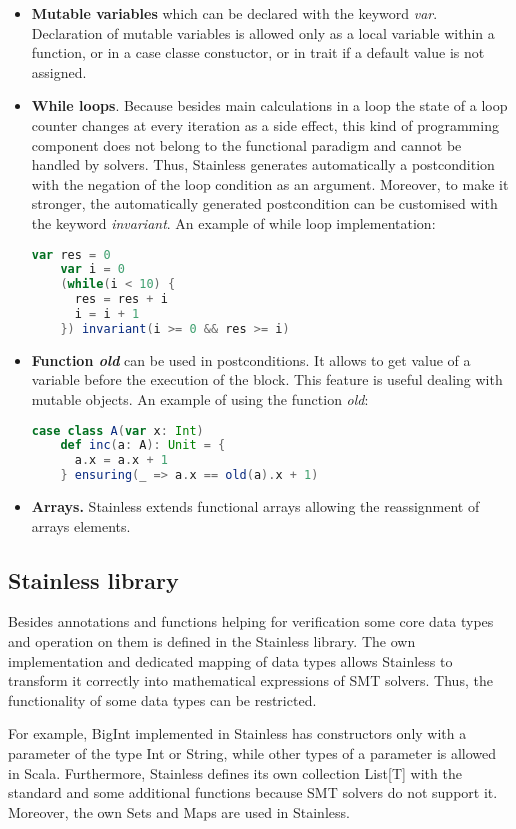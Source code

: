 \begin{itemize}
  \item \textbf{Mutable variables} which can be declared with the keyword \textit{var}.
  Declaration of mutable variables is allowed only as a local variable within a function, or in a case classe constuctor, or in trait if a default value is not assigned.
  \item  \textbf{While loops}. 
  Because besides main calculations in a loop the state of a loop counter changes at every iteration as a side effect, this kind of programming component does not belong to the functional paradigm and cannot be handled by solvers.
  Thus, Stainless generates automatically a postcondition with the negation of the loop condition as an argument. 
  Moreover, to make it stronger, the automatically generated postcondition can be customised with the keyword \textit{invariant}.
  An example of while loop implementation:
  \begin{lstlisting}[language=Scala]
    var res = 0
    var i = 0
    (while(i < 10) {
      res = res + i
      i = i + 1
    }) invariant(i >= 0 && res >= i)
  \end{lstlisting}
  \item \textbf{Function \textit{old}} can be used in postconditions. 
  It allows to get value of a variable before the execution of the block.
  This feature is useful dealing with mutable objects.
  An example of using the function \textit{old}:
  \begin{lstlisting}[language=Scala]
    case class A(var x: Int)
    def inc(a: A): Unit = {
      a.x = a.x + 1
    } ensuring(_ => a.x == old(a).x + 1)
  \end{lstlisting}
  \item \textbf{Arrays.} Stainless extends functional arrays allowing the reassignment of arrays elements. \cite{Stainless:imperative}
\end{itemize}


\subsection{Stainless library}

Besides annotations and functions helping for verification  some core data types and operation on them is defined in the Stainless library.
The own implementation and dedicated mapping of data types allows Stainless to transform it correctly into mathematical expressions of SMT solvers.
Thus, the functionality of some data types can be restricted.

For example, BigInt implemented in Stainless has constructors only with a parameter of the type Int or String, while other types of a parameter is allowed in Scala.
Furthermore, Stainless defines its own collection List[T] with the standard and some additional functions because SMT solvers do not support it.
Moreover, the own Sets and Maps are used in Stainless. \cite{Stainless:library}